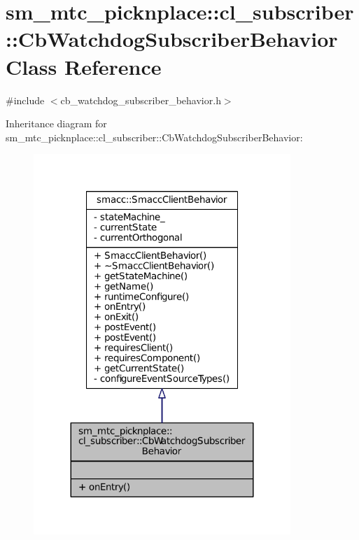 \hypertarget{classsm__mtc__picknplace_1_1cl__subscriber_1_1CbWatchdogSubscriberBehavior}{}\section{sm\+\_\+mtc\+\_\+picknplace\+:\+:cl\+\_\+subscriber\+:\+:Cb\+Watchdog\+Subscriber\+Behavior Class Reference}
\label{classsm__mtc__picknplace_1_1cl__subscriber_1_1CbWatchdogSubscriberBehavior}


{\ttfamily \#include $<$cb\+\_\+watchdog\+\_\+subscriber\+\_\+behavior.\+h$>$}



Inheritance diagram for sm\+\_\+mtc\+\_\+picknplace\+:\+:cl\+\_\+subscriber\+:\+:Cb\+Watchdog\+Subscriber\+Behavior\+:
\nopagebreak
\begin{figure}[H]
\begin{center}
\leavevmode
\includegraphics[width=275pt]{classsm__mtc__picknplace_1_1cl__subscriber_1_1CbWatchdogSubscriberBehavior__inherit__graph}
\end{center}
\end{figure}


